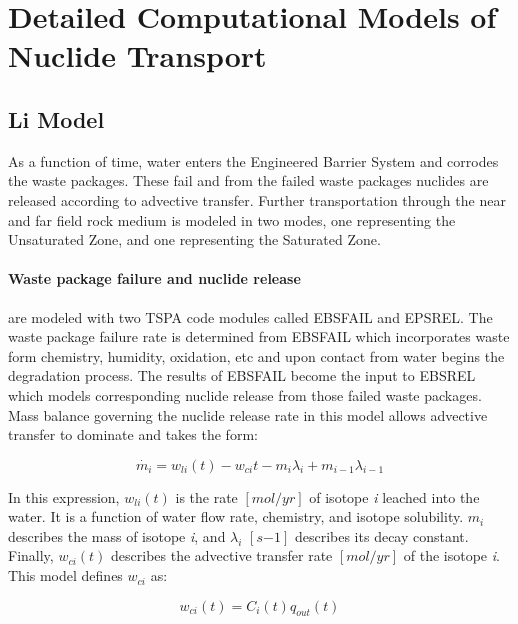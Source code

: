 \section{Detailed Computational Models of Nuclide Transport}
\label{sec:detailed_nuclide}


\subsection{Li Model\cite{li_methodology_2006}} As a function of time, water
enters the Engineered Barrier System and corrodes the waste packages.  These
fail and from the failed waste packages nuclides are released according to
advective transfer.  Further transportation through the near and far field rock
medium is modeled in two modes, one representing the Unsaturated Zone, and one
representing the Saturated Zone.

\paragraph{Waste package failure and nuclide release} are modeled with two TSPA
code modules called EBSFAIL and EPSREL. The waste package failure rate is
determined from EBSFAIL which incorporates waste form chemistry, humidity,
oxidation, etc and upon contact from water begins the degradation process. The
results of EBSFAIL become the input to EBSREL which models corresponding
nuclide release from those failed waste packages. Mass balance governing the
nuclide release rate in this model allows advective transfer to dominate and
takes the form:

\begin{equation}
\dot{m_i}=w_{li}(t)-w_{ci}{t}-m_i\lambda_i+m_{i-1}\lambda_{i-1}\nonumber
\end{equation}

In this expression, $w_{li}(t)$ is the rate $[mol/yr]$ of isotope \emph{i}
leached into the water.  It is a function of water flow rate, chemistry, and
isotope solubility. $m_i$ describes the mass of isotope \emph{i}, and
$\lambda_i$ $[s{-1}]$ describes its decay constant. Finally, $w_{ci}(t)$
describes the advective transfer rate $[mol/yr]$ of the isotope \emph{i}. This 
model defines $w_{ci}$ as:

\begin{equation}
  w_{ci}(t)=C_i(t)q_{out}(t) 
\end{equation}

